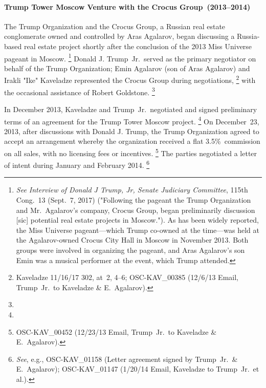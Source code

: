 \paragraph{Trump Tower Moscow Venture with the Crocus Group~(2013--2014)}

The Trump Organization and the Crocus Group, a Russian real estate conglomerate owned and controlled by Aras Agalarov, began discussing a Russia-based real estate project shortly after the conclusion of the 2013 Miss Universe pageant in Moscow.%
\footnote{\textit{See Interview of Donald J Trump, Jr, Senate Judiciary Committee}, 115th Cong.~13 (Sept.~7, 2017) ("Following the pageant the Trump Organization and Mr.~Agalarov's company, Crocus Group, began preliminarily discussion [sic] potential real estate projects in Moscow.").
As has been widely reported, the Miss Universe pageant---which Trump co-owned at the time---was held at the Agalarov-owned Crocus City Hall in Moscow in November
2013. Both groups were involved in organizing the pageant, and Aras Agalarov's son Emin was a musical performer at the event, which Trump attended.}
Donald J. Trump~Jr.\ served as the primary negotiator on behalf of the Trump Organization; Emin Agalarov (son of Aras Agalarov) and Irakli "Ike" Kaveladze represented the Crocus Group during negotiations,%
\footnote{Kaveladze 11/16/17 302, at~2, 4--6;  OSC-KAV\_00385 (12/6/13 Email, Trump~Jr.\ to Kaveladze \& E.~Agalarov).}
with the occasional assistance of Robert Goldstone.%
\footnote{}

In December 2013, Kaveladze and Trump~Jr.\ negotiated and signed preliminary terms of an agreement for the Trump Tower Moscow project.%
\footnote{}
On December~23, 2013, after discussions with Donald J. Trump, the Trump Organization agreed to accept an arrangement whereby the organization received a flat 3.5\%~commission on all sales, with no licensing fees or incentives.%
\footnote{OSC-KAV\_00452 (12/23/13 Email, Trump~Jr.\ to Kaveladze \& E.~Agalarov).}
The parties negotiated a letter of intent during January and February 2014.%
\footnote{\textit{See}, e.g., OSC-KAV\_01158 (Letter agreement signed by Trump~Jr.\ \& E.~Agalarov); OSC-KAV\_01147 (1/20/14 Email, Kaveladze to Trump~Jr.\ et al.).}

